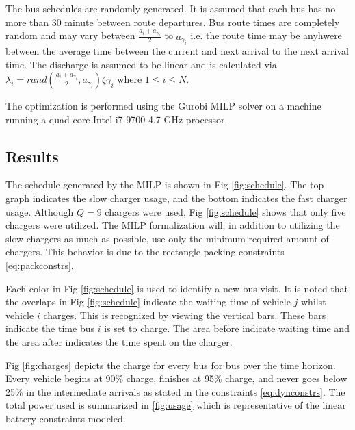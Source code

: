 \documentclass[letterpaper, 10pt, conference]{IEEEtran}
\begin{document}
The bus schedules are randomly generated. It is assumed that each bus has no more than 30 minute between route departures. Bus route times are completely random and may vary between \(\frac{a_i + a_{\gamma_i}}{2}\) to \(a_{\gamma_i}\) i.e. the route time may be anyhwere between the average time between the current and next arrival to the next arrival time. The discharge is assumed to be linear and is calculated via \(\lambda_i = rand(\frac{a_i + a_{\gamma_i}}{2},a_{\gamma_i})\zeta{\gamma_i}\) where \(1 \leq i \leq N\).

The optimization is performed using the Gurobi MILP solver \cite{Hespanha2018} on a machine running a quad-core Intel i7-9700 4.7 GHz processor.

\subsection{Results}
The schedule generated by the MILP is shown in Fig \ref{fig:schedule}. The top graph indicates the slow charger usage, and the bottom indicates the fast charger usage. Although \(Q = 9\) chargers were used, Fig \ref{fig:schedule} shows that only five chargers were utilized. The MILP formalization will, in addition to utilizing the slow chargers as much as possible, use only the minimum required amount of chargers. This behavior is due to the rectangle packing constraints \eqref{eq:packconstrs}.

Each color in Fig \ref{fig:schedule} is used to identify a new bus visit. It is noted that the overlaps in Fig \ref{fig:schedule} indicate the waiting time of vehicle \(j\) whilst vehicle \(i\) charges. This is recognized by viewing the vertical bars. These bars indicate the time bus \(i\) is set to charge. The area before indicate waiting time and the area after indicates the time spent on the charger.

Fig \ref{fig:charges} depicts the charge for every bus for bus over the time horizon. Every vehicle begins at 90\% charge, finishes at 95\% charge, and never goes below 25\% in the intermediate arrivals as stated in the constraints \eqref{eq:dynconstrs}. The total power used is summarized in \ref{fig:usage} which is representative of the linear battery constraints modeled.
\end{document}
